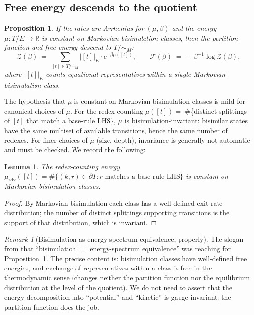 \documentclass[11pt]{article}
\theoremstyle{plain}
\newtheorem{proposition}[theorem]{Proposition}
\newtheorem{lemma}[theorem]{Lemma}
\theoremstyle{definition}
\theoremstyle{remark}
\newtheorem{remark}[theorem]{Remark}
\newcommand{\R}{\mathbb{R}}
\newcommand{\Z}{\mathcal{Z}}
\newcommand{\F}{\mathcal{F}}
\newcommand{\bd}{\partial}
\begin{document}
\subsection{Free energy descends to the quotient}

\begin{proposition}\label{prop:Fdescends}
If the rates are Arrhenius for $(\mu, \beta)$ and the energy $\mu : T/E \to \R$ is constant on Markovian bisimulation classes, then the partition function and free energy descend to $T/{\sim_M}$:
\[
\Z(\beta) \;=\; \sum_{[t] \in T/{\sim_M}} |[t]|_E \cdot e^{-\beta \mu([t])},
\qquad
\F(\beta) \;=\; -\beta^{-1} \log \Z(\beta),
\]
where $|[t]|_E$ counts equational representatives within a single Markovian bisimulation class.
\end{proposition}

The hypothesis that $\mu$ is constant on Markovian bisimulation classes is mild for canonical choices of $\mu$. For the redex-counting $\mu([t]) = $ \#\{distinct splittings of $[t]$ that match a base-rule LHS\}, $\mu$ is bisimulation-invariant: bisimilar states have the same multiset of available transitions, hence the same number of redexes. For finer choices of $\mu$ (size, depth), invariance is generally not automatic and must be checked. We record the following:

\begin{lemma}\label{lem:redex-mu}
The redex-counting energy $\mu_{\mathrm{rdx}}([t]) = \#\{(k,r) \in \bd T : r \text{ matches a base rule LHS}\}$ is constant on Markovian bisimulation classes.
\end{lemma}

\begin{proof}
By Markovian bisimulation each class has a well-defined exit-rate distribution; the number of distinct splittings supporting transitions is the support of that distribution, which is invariant.
\end{proof}

\begin{remark}[Bisimulation as energy-spectrum equivalence, properly]
The slogan from \cite{energetics-context} that ``bisimulation $=$ energy-spectrum equivalence'' was reaching for Proposition~\ref{prop:Fdescends}. The precise content is: bisimulation classes have well-defined free energies, and exchange of representatives within a class is free in the thermodynamic sense (changes neither the partition function nor the equilibrium distribution at the level of the quotient). We do not need to assert that the energy decomposition into ``potential'' and ``kinetic'' is gauge-invariant; the partition function does the job.
\end{remark}
\end{document}
